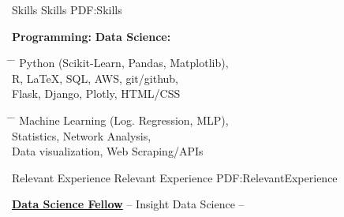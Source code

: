 \documentclass[letterpaper,MMMyyyy,nonstopmode]{simpleresumecv}
\begin{document}
\begin{Body}


\Section
{Skills}
{Skills}
{PDF:Skills}
\Entry
\begin{Detail}
{\bf Programming:} \hspace{5.2cm} {\bf Data Science:}

\parbox{0.5\textwidth}{ %
\begin{tabbing}

\hspace{3cm} \= \hspace{4cm} \= \kill
\newline
Python (Scikit-Learn, Pandas, Matplotlib), \\
R, LaTeX, SQL, AWS, git/github, \\
Flask, Django, Plotly, HTML/CSS%
\end{tabbing}}
\hfill %
\parbox{0.5\textwidth}{ %
\begin{tabbing}
\hspace{3cm} \= \hspace{4cm} \= \kill
Machine Learning (Log. Regression, MLP), \\%
Statistics, Network Analysis,\\
Data visualization, Web Scraping/APIs

\end{tabbing}}
\end{Detail}

\vspace{3mm}


\Section
{Relevant Experience}
{Relevant Experience}
{PDF:RelevantExperience}

\Entry
\begin{Detail}
\href{https://www.insightdatascience.com/}
{\textbf{Data Science Fellow}} -- Insight Data Science \hfill {} \hspace{1mm} -- \hspace{1mm} %



\end{Detail}
\end{Body}
\end{document}
